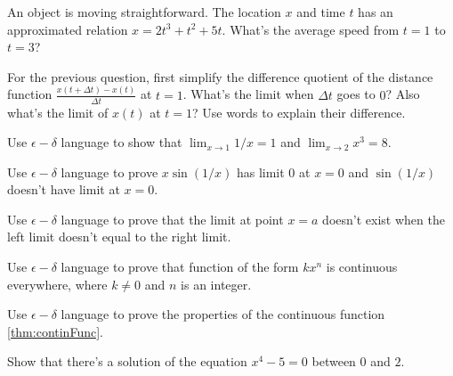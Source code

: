 \documentclass[Calculus 1 Recitation.tex]{subfiles}
\begin{document}
\begin{myleftlinebox}
	An object is moving straightforward. The location $x$ and time $t$ has an approximated relation $x = 2t^3+t^2+5t$. What's the average speed from $t=1$ to $t=3$?
	\tcblower
	\vspace{2em}
\end{myleftlinebox}

\begin{myleftlinebox}
	For the previous question, first simplify the difference quotient of the distance function $\frac{x(t+\Delta t)-x(t)}{\Delta t}$ at $t=1$. What's the limit when $\Delta t$ goes to $0$? Also what's the limit of $x(t)$ at $t=1$? Use words to explain their difference.
	\tcblower
	\vspace{2em}
\end{myleftlinebox}


\begin{myleftlinebox}
	Use $\epsilon-\delta$ language to show that $\lim_{x\to 1} 1/x = 1$ and $\lim_{x\to 2} x^3 = 8$.
	\tcblower
	\vspace{2em}
\end{myleftlinebox}

\begin{myleftlinebox}
	Use $\epsilon-\delta$ language to prove $x\sin(1/x)$ has limit $0$ at $x=0$ and $\sin(1/x)$ doesn't have limit at $x=0$.
	\tcblower
	\vspace{2em}
\end{myleftlinebox}

\begin{myleftlinebox}
	Use $\epsilon-\delta$ language to prove that the limit at point $x=a$ doesn't exist when the left limit doesn't equal to the right limit.
	\tcblower
	\vspace{2em}
\end{myleftlinebox}

\begin{myleftlinebox}
	Use $\epsilon-\delta$ language to prove that function of the form $k x^n$ is continuous everywhere, where $k\neq 0$ and $n$ is an integer.
	\tcblower
	\vspace{2em}
\end{myleftlinebox}

\begin{myleftlinebox}
	Use $\epsilon-\delta$ language to prove the properties of the continuous function \autoref {thm:continFunc}.
	\tcblower
	\vspace{2em}
\end{myleftlinebox}

\begin{myleftlinebox}
	Show that there's a solution of the equation $x^4-5=0$ between $0$ and $2$.
	\tcblower
	\vspace{2em}
\end{myleftlinebox}
\end{document}
